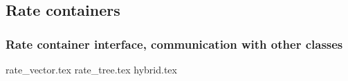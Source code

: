 \graphicspath{{\relativepath/figures/}}

\subsection{Rate containers}

\subsubsection{Rate container interface, communication with other classes}

 {rate_vector.tex}
 {rate_tree.tex}
 {hybrid.tex}